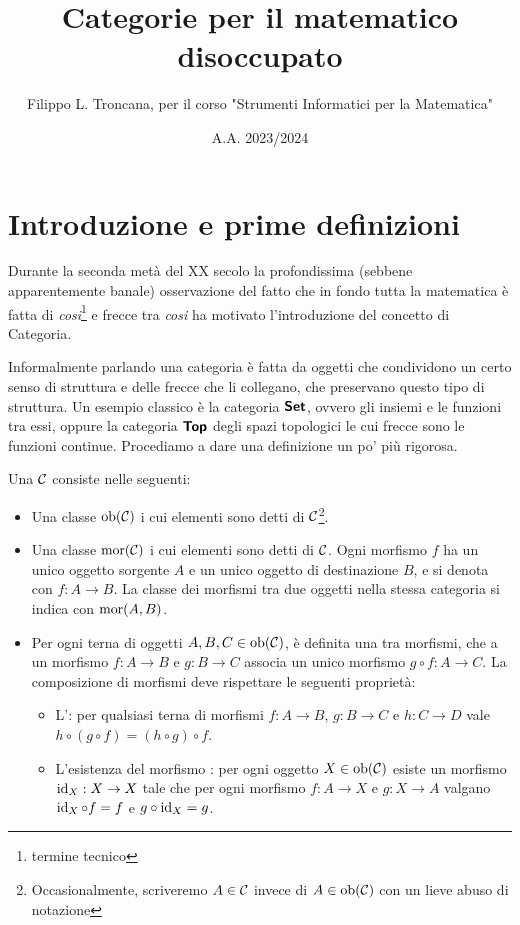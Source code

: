 \documentclass{article}
\title{Categorie per il matematico disoccupato}
\author{Filippo L. Troncana, per il corso "Strumenti Informatici per la Matematica"}
\date{A.A. 2023/2024}
\begin{document}
\nocite{*}
\maketitle

\section{Introduzione e prime definizioni}
\label{sec:Intro}

Durante la seconda metà del XX secolo la profondissima (sebbene apparentemente banale) osservazione del fatto che in fondo tutta la matematica è fatta di \textit{cosi}\footnote{termine tecnico} e frecce tra \textit{cosi} ha motivato l'introduzione del concetto di Categoria.

Informalmente parlando una categoria è fatta da oggetti che condividono un certo senso di struttura e delle frecce che li collegano, che preservano questo tipo di struttura. Un esempio classico è la categoria $\text{\sffamily\textbf{Set}}$, ovvero gli insiemi e le funzioni tra essi, oppure la categoria $\text{\sffamily\textbf{Top}}$ degli spazi topologici le cui frecce sono le funzioni continue. Procediamo a dare una definizione un po' più rigorosa.

\begin{definition}
    Una  $\mathcal{C}$ consiste nelle seguenti:
    \begin{itemize}
        \item Una classe $\operatorname{ob}(\mathcal{C})$ i cui elementi sono detti  di $\mathcal{C}$\footnote{Occasionalmente, scriveremo $A\in \mathcal{C}$ invece di $A \in \operatorname{ob}(\mathcal{C})$ con un lieve abuso di notazione}.
        \item Una classe $\operatorname{mor}(\mathcal{C})$ i cui elementi sono detti  di $\mathcal{C}$. Ogni morfismo $f$ ha un unico oggetto sorgente $A$ e un unico oggetto di destinazione $B$, e si denota con $f:A\to B$. La classe dei morfismi tra due oggetti nella stessa categoria si indica con $\operatorname{mor}(A,B)$.
        \item Per ogni terna di oggetti $A,B,C \in \operatorname{ob}(\mathcal{C})$, è definita una  tra morfismi, che a un morfismo $f : A \to B$ e $g: B \to C$ associa un unico morfismo $g \circ f : A \to C$. La composizione di morfismi deve rispettare le seguenti proprietà:
        \begin{itemize}
            \item L': per qualsiasi terna di morfismi $f: A\to B$, $g: B\to C$ e $h:C \to D$ vale $h \circ (g \circ f) = (h \circ g) \circ f$.
            \item L'esistenza del morfismo : per ogni oggetto $X \in \operatorname{ob}(\mathcal{C})$ esiste un morfismo $\operatorname{id}_{X} : X \to X$ tale che per ogni morfismo $f:A \to X$ e $g: X \to A$ valgano $\operatorname{id}_{X} \circ f = f$ e $g \circ \operatorname{id}_{X} = g$.
        \end{itemize}
    \end{itemize}
\end{definition}
\end{document}
